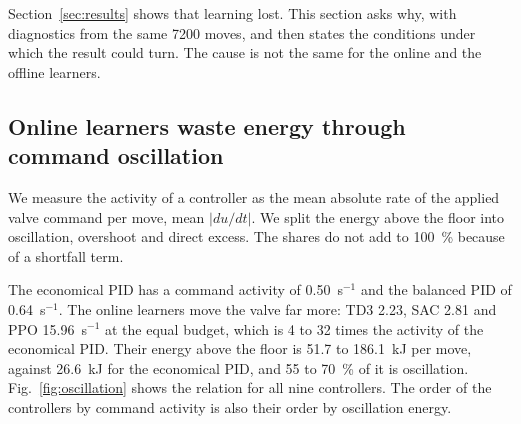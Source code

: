 %
%

\label{sec:why}%
Section~\ref{sec:results} shows that learning lost. This section asks why, with diagnostics
from the same 7200 moves, and then states the conditions under which the result
could turn. The cause is not the same for the online and the offline learners.

\subsection{Online learners waste energy through command oscillation}

We measure the activity of a controller as the mean absolute rate of the
applied valve command per move, mean $|du/dt|$. %
We split the energy above the floor into oscillation, overshoot and direct
excess. The shares do not add to 100~\% because of a shortfall term. %

The economical PID has a command activity of 0.50~s$^{-1}$ and the balanced PID
of 0.64~s$^{-1}$. %
The online learners move the valve far more: TD3 2.23, SAC 2.81 and PPO
15.96~s$^{-1}$ at the equal budget, which is 4 to 32 times the activity of the
economical PID. %
Their energy above the floor is 51.7 to 186.1~kJ per move, against 26.6~kJ for
the economical PID, and 55 to 70~\% of it is oscillation. %
Fig.~\ref{fig:oscillation} shows the relation for all nine controllers. The
order of the controllers by command activity is also their order by
oscillation energy. %

